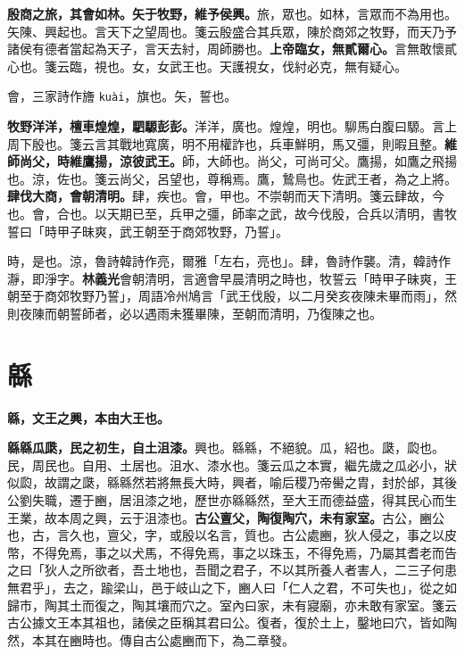 \textbf{殷商之旅，其會如林。矢于牧野，維予侯興。}{\footnotesize 旅，眾也。如林，言眾而不為用也。矢陳、興起也。言天下之望周也。箋云殷盛合其兵眾，陳於商郊之牧野，而天乃予諸侯有德者當起為天子，言天去紂，周師勝也。}\textbf{上帝臨女，無貳爾心。}{\footnotesize 言無敢懷貳心也。箋云臨，視也。女，女武王也。天護視女，伐紂必克，無有疑心。}

\begin{quoting}會，三家詩作旝 \texttt{kuài}，旗也。矢，誓也。\end{quoting}

\textbf{牧野洋洋，檀車煌煌，駟騵彭彭。}{\footnotesize 洋洋，廣也。煌煌，明也。駠馬白腹曰騵。言上周下殷也。箋云言其戰地寬廣，明不用權詐也，兵車鮮明，馬又彊，則暇且整。}\textbf{維師尚父，時維鷹揚，涼彼武王。}{\footnotesize 師，大師也。尚父，可尚可父。鷹揚，如鷹之飛揚也。涼，佐也。箋云尚父，呂望也，尊稱焉。鷹，鷙鳥也。佐武王者，為之上將。}\textbf{肆伐大商，會朝清明。}{\footnotesize 肆，疾也。會，甲也。不崇朝而天下清明。箋云肆故，今也。會，合也。以天期已至，兵甲之彊，師率之武，故今伐殷，合兵以清明，書牧誓曰「時甲子昧爽，武王朝至于商郊牧野，乃誓」。}

\begin{quoting}時，是也。涼，魯詩韓詩作亮，爾雅「左右，亮也」。肆，魯詩作襲。清，韓詩作瀞，即淨字。\textbf{林義光}會朝清明，言適會早晨清明之時也，牧誓云「時甲子昧爽，王朝至于商郊牧野乃誓」，周語冷州鳩言「武王伐殷，以二月癸亥夜陳未畢而雨」，然則夜陳而朝誓師者，必以遇雨未獲畢陳，至朝而清明，乃復陳之也。\end{quoting}

\section{緜}


\textbf{緜，文王之興，本由大王也。}

\textbf{緜緜瓜瓞，民之初生，自土沮漆。}{\footnotesize 興也。緜緜，不絕貌。瓜，紹也。瓞，瓝也。民，周民也。自用、土居也。沮水、漆水也。箋云瓜之本實，繼先歲之瓜必小，狀似瓝，故謂之瓞，緜緜然若將無長大時，興者，喻后稷乃帝嚳之胄，封於邰，其後公劉失職，遷于豳，居沮漆之地，歷世亦緜緜然，至大王而德益盛，得其民心而生王業，故本周之興，云于沮漆也。}\textbf{古公亶父，陶復陶穴，未有家室。}{\footnotesize 古公，豳公也，古，言久也，亶父，字，或殷以名言，質也。古公處豳，狄人侵之，事之以皮幣，不得免焉，事之以犬馬，不得免焉，事之以珠玉，不得免焉，乃屬其耆老而告之曰「狄人之所欲者，吾土地也，吾聞之君子，不以其所養人者害人，二三子何患無君乎」，去之，踰梁山，邑于岐山之下，豳人曰「仁人之君，不可失也」，從之如歸市，陶其土而復之，陶其壤而穴之。室內曰家，未有寢廟，亦未敢有家室。箋云古公據文王本其祖也，諸侯之臣稱其君曰公。復者，復於土上，鑿地曰穴，皆如陶然，本其在豳時也。傳自古公處豳而下，為二章發。}

